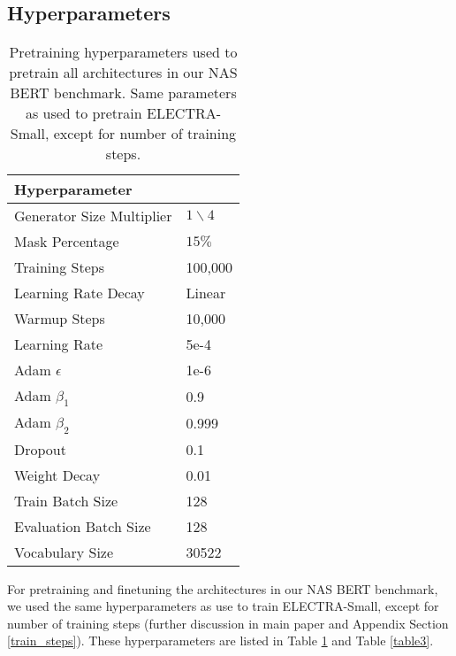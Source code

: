 \documentclass[11pt]{article}
\begin{document}
\subsection{Hyperparameters} \label{hyperparameters}
    \begin{table}[h]
        \centering 
        \begin{tabular}{l l}
        \hline
        \textbf{Hyperparameter} &  \\
        \hline
        Generator Size Multiplier & $1\backslash4$ \\
        Mask Percentage & $15\%$ \\
        Training Steps & 100,000 \\
        Learning Rate Decay & Linear \\
        Warmup Steps & 10,000 \\
        Learning Rate & 5e-4 \\
        Adam $\epsilon$ & 1e-6 \\
        Adam $\beta_1$ & 0.9 \\
        Adam $\beta_2$ & 0.999 \\
        Dropout & 0.1 \\
        Weight Decay & 0.01 \\
        Train Batch Size & 128 \\
        Evaluation Batch Size & 128 \\
        Vocabulary Size & 30522 \\
        \hline
        \end{tabular}
        \caption{Pretraining hyperparameters used to pretrain all architectures in our NAS BERT benchmark. Same parameters as used to pretrain ELECTRA-Small, except for number of training steps.}
        \label{table2}
    \end{table}

    For pretraining and finetuning the architectures in our NAS BERT benchmark, we used the same hyperparameters as use to train ELECTRA-Small, except for number of training steps (further discussion in main paper and Appendix Section \ref{train_steps}). These hyperparameters are listed in Table \ref{table2} and Table \ref{table3}. 
\end{document}
